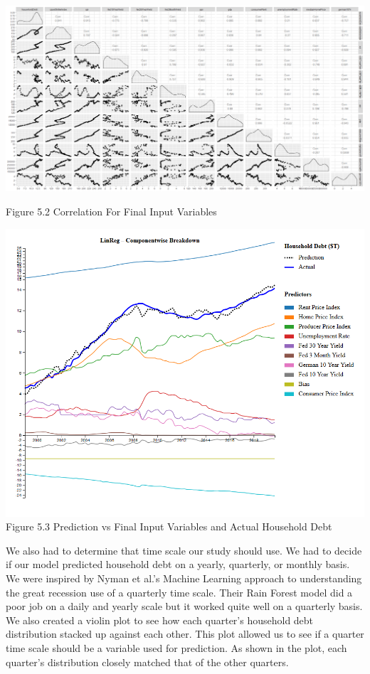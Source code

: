 \documentclass[sigconf,nonacm,11pt]{acmart}
\begin{document}
\vspace{0.5em}
\includegraphics[scale = 0.13]{Correlation_Plot_Final.png}

Figure 5.2 Correlation For Final Input Variables
\vspace{1.25em}

\includegraphics[scale = 0.25]{linreg.png}
Figure 5.3 Prediction vs Final Input Variables and Actual Household Debt 
\vspace{1.0em}


We also had to determine that time scale our study should use. We had to decide if our model predicted household debt on a yearly, quarterly, or monthly basis. We were inspired by Nyman et al.'s Machine Learning approach to understanding the great recession\cite{Nyman2018} use of a quarterly time scale.  Their Rain Forest model did a poor job on a daily and yearly scale but it worked quite well on a quarterly basis. We also created a violin plot to see how each quarter's household debt distribution stacked up against each other. This plot allowed us to see if a quarter time scale should be a variable used for prediction.  As shown in the plot, each quarter's distribution closely matched that of the other quarters.
 
\end{document}
